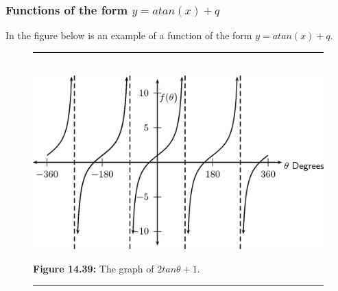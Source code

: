             \subsubsection{ Functions of the form $y=atan\left(x\right)+q$}
            \nopagebreak
        \label{m39414*id90209}In the figure below is an example of a function of the form $y=atan\left(x\right)+q$.\par 
    \setcounter{subfigure}{0}
	\begin{figure}[H] %
    \begin{center}
    \rule[.1in]{\figurerulewidth}{.005in} \\
        \label{m39414*uid73!!!underscore!!!media}\label{m39414*uid73!!!underscore!!!printimage}\includegraphics{col11306.imgs/m39414_MG10C15_045.png} %
      \vspace{2pt}
    \vspace{\rubberspace}\par \begin{cnxcaption}
	  \small \textbf{Figure 14.39: }The graph of $2tan\theta +1$.
	\end{cnxcaption}
    \vspace{.1in}
    \rule[.1in]{\figurerulewidth}{.005in} \\
    \end{center}
 \end{figure}       
\label{m39414*secfhsst!!!underscore!!!id3205}
